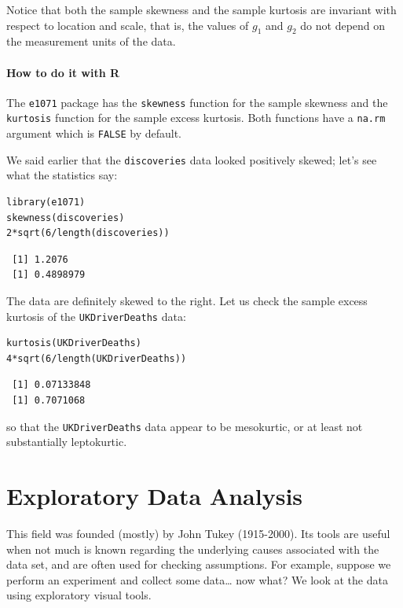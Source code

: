 \documentclass[captions=tableheading]{scrbook}
\begin{document}
Notice that both the sample skewness and the sample kurtosis are invariant with respect to location and scale, that is, the values of \(g_{1}\) and \(g_{2}\) do not depend on the measurement units of the data. 

\paragraph*{How to do it with \textsf{R}}

The \texttt{e1071} package \cite{Dimitriadoue1071} has the \texttt{skewness} function for the sample skewness and the \texttt{kurtosis} function for the sample excess kurtosis. Both functions have a \texttt{na.rm} argument which is \texttt{FALSE} by default.

\begin{example}
We said earlier that the \texttt{discoveries} data looked positively skewed; let's see what the statistics say:
\end{example}


\begin{verbatim}
library(e1071)
skewness(discoveries)
2*sqrt(6/length(discoveries))
\end{verbatim}

\begin{verbatim}
 [1] 1.2076
 [1] 0.4898979
\end{verbatim}

The data are definitely skewed to the right. Let us check the sample excess kurtosis of the \texttt{UKDriverDeaths} data:


\begin{verbatim}
kurtosis(UKDriverDeaths)
4*sqrt(6/length(UKDriverDeaths))
\end{verbatim}

\begin{verbatim}
 [1] 0.07133848
 [1] 0.7071068
\end{verbatim}

so that the \texttt{UKDriverDeaths} data appear to be mesokurtic, or at least not substantially leptokurtic.
\section{Exploratory Data Analysis}
\label{sec-3-4}

\label{sec:Exploratory-Data-Analysis}

This field was founded (mostly) by John Tukey (1915-2000). Its tools are useful when not much is known regarding the underlying causes associated with the data set, and are often used for checking assumptions. For example, suppose we perform an experiment and collect some data\ldots{} now what? We look at the data using exploratory visual tools.
\end{document}
